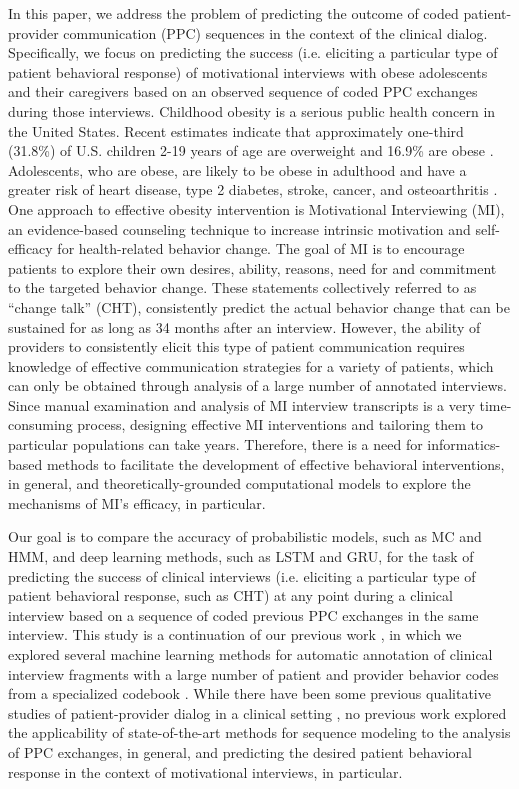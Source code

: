 \documentclass{amia_summit_2018}
\begin{document}
In this paper, we address the problem of predicting the outcome of coded patient-provider communication (PPC) sequences in the context of the clinical dialog. Specifically, we focus on predicting the success (i.e. eliciting a particular type of patient behavioral response) of motivational interviews with obese adolescents and their caregivers based on an observed sequence of coded PPC exchanges during those interviews. Childhood obesity is a serious public health concern in the United States. Recent estimates indicate that approximately one-third (31.8\%) of U.S. children 2-19 years of age are overweight and 16.9\% are obese \cite{ogden2012prevalence}. Adolescents, who are obese, are likely to be obese in adulthood and have a greater risk of heart disease, type 2 diabetes, stroke, cancer, and osteoarthritis \cite{general2010surgeon}. One approach to effective obesity intervention is Motivational Interviewing (MI), an evidence-based counseling technique to increase intrinsic motivation and self-efficacy for health-related behavior change. The goal of MI is to encourage patients to explore their own desires, ability, reasons, need for and commitment to the targeted behavior change. These statements collectively referred to as ``change talk'' (CHT), consistently predict the actual behavior change\cite{apodaca2009mechanisms} that can be sustained for as long as 34 months\cite{walker2011influence} after an interview. However, the ability of providers to consistently elicit this type of patient communication requires knowledge of effective communication strategies for a variety of patients, which can only be obtained through analysis of a large number of annotated interviews. Since manual examination and analysis of MI interview transcripts is a very time-consuming process, designing effective MI interventions and tailoring them to particular populations can take years. Therefore, there is a need for informatics-based methods to facilitate the development of effective behavioral interventions, in general, and theoretically-grounded computational models to explore the mechanisms of MI's efficacy, in particular.

Our goal is to compare the accuracy of probabilistic models, such as MC and HMM, and deep learning methods, such as LSTM and GRU, for the task of predicting the success of clinical interviews (i.e. eliciting a particular type of patient behavioral response, such as CHT) at any point during a clinical interview based on a sequence of coded previous PPC exchanges in the same interview. This study is a continuation of our previous work \cite{kotov2015interpretable, hasan2016study}, in which we explored several machine learning methods for automatic annotation of clinical interview fragments with a large number of patient and provider behavior codes from a specialized codebook \cite{carcone2013provider}. While there have been some previous qualitative studies of patient-provider dialog in a clinical setting \cite{eide2004physician}, no previous work explored the applicability of state-of-the-art methods for sequence modeling to the analysis of PPC exchanges, in general, and predicting the desired patient behavioral response in the context of motivational interviews, in particular.
\end{document}
